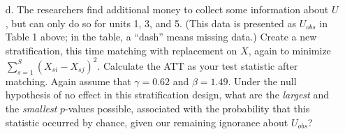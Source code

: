 \documentclass{article}
\newcommand\independent{\protect\mathpalette{\protect\independenT}{\perp}}
\def\independenT#1#2{\mathrel{\rlap{$#1#2$}\mkern2mu{#1#2}}}
\begin{document}

\begin{itemize}
\item[d.] The researchers find additional money to collect some
  information about $U$, but can only do so for units 1, 3, and 5.
  (This data is presented as $U_{obs}$ in Table 1 above; in the table,
  a ``dash'' means missing data.)  Create a new stratification, this
  time matching with replacement on $X$, again to minimize
  $\sum_{s=1}^{S}(X_{si}-X_{sj})^2$.  Calculate the ATT as your test
  statistic after matching.  Again assume that $\gamma=0.62$ and
  $\beta=1.49$.  Under the null hypothesis of no effect in this
  stratification design, what are the {\em largest} and the {\em
    smallest} $p$-values possible, associated with the probability
  that this statistic occurred by chance, given our remaining
  ignorance about $U_{obs}$?





\end{itemize}



\end{document}

